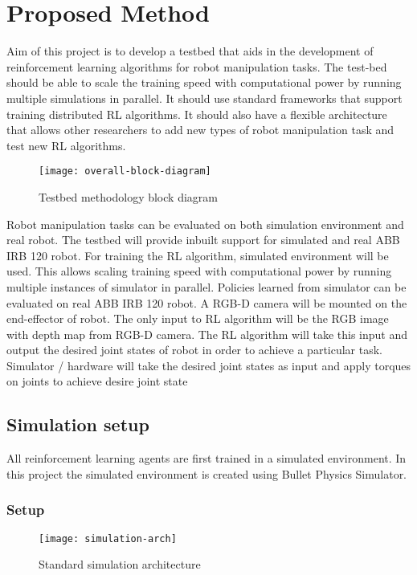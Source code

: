 \chapter{Proposed Method}

Aim of this project is to develop a testbed that aids in the development of reinforcement learning algorithms for robot manipulation tasks. The test-bed should be able to scale the training speed with computational power by running multiple simulations in parallel. It should use standard frameworks that support training distributed RL algorithms. It should also have a flexible architecture that allows other researchers to add new types of robot manipulation task and test new RL algorithms.

\begin{figure}[H]
	\centering
	\texttt{[image: overall-block-diagram]}
	\caption{Testbed methodology block diagram}
	\label{fig:simulation-arch}
\end{figure}

Robot manipulation tasks can be evaluated on both simulation environment and real robot. The testbed will provide inbuilt support for simulated and real ABB IRB 120 robot. For training the RL algorithm, simulated environment will be used. This allows scaling training speed with computational power by running multiple instances of simulator in parallel. Policies learned from simulator can be evaluated on real ABB IRB 120 robot. A RGB-D camera will be mounted on the end-effector of robot. The only input to RL algorithm will be the RGB image with depth map from RGB-D camera. The RL algorithm will take this input and output the desired joint states of robot in order to achieve a particular task. Simulator / hardware will take the desired joint states as input and apply torques on joints to achieve desire joint state

\section {Simulation setup}
All reinforcement learning agents are first trained in a simulated environment. In this project the simulated environment is created using Bullet Physics Simulator.

\subsection{Setup}
\begin{figure}[H]
	\centering
	\texttt{[image: simulation-arch]}
	\caption{Standard simulation architecture}
	\label{fig:simulation-arch}
\end{figure}

